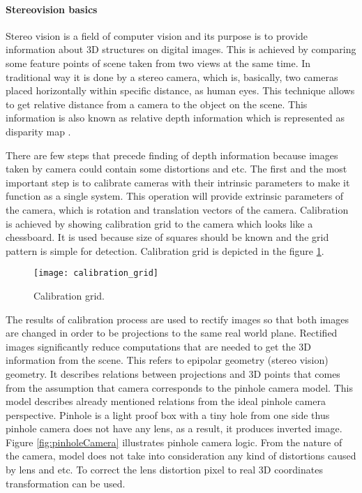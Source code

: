 \documentclass[../../../../main]{subfiles}
\begin{document}
\paragraph{Stereovision basics}

Stereo vision is a field of computer vision and its purpose is to provide information about 3D structures on digital images. This is achieved by comparing some feature points of scene taken from two views at the same time. In traditional way it is done by a stereo camera, which is, basically, two cameras placed horizontally within specific distance, as human eyes. This technique allows to get relative distance from a camera to the object on the scene. This information is also known as relative depth information which is represented as disparity map \cite{Hartley2004}.

There are few steps that precede finding of depth information because images taken by camera could contain some distortions and etc. The first and the most important step is to calibrate cameras with their intrinsic parameters to make it function as a single system. This operation will provide extrinsic parameters of the camera, which is rotation and translation vectors of the camera. Calibration is achieved by showing calibration grid to the camera which looks like a chessboard. It is used because size of squares should be known and the grid pattern is simple for detection. Calibration grid is depicted in the figure \ref{fig:calibrationGrid}.

\begin{figure} [ht]
    \begin{center}
        \texttt{[image: calibration\_grid]}
        \caption{Calibration grid.}
        \label{fig:calibrationGrid}
    \end{center}
\end{figure}

\newpage

The results of calibration process are used to rectify images so that both images are changed in order to be projections to the same real world plane. Rectified images significantly reduce computations that are needed to get the 3D information from the scene. This refers to epipolar geometry (stereo vision) geometry. It describes relations between projections and 3D points that comes from the assumption that camera corresponds to the pinhole camera model. This model describes already mentioned relations from the ideal pinhole camera perspective. Pinhole is a light proof box with a tiny hole from one side thus pinhole camera does not have any lens, as a result, it produces inverted image. Figure \ref{fig:pinholeCamera} illustrates pinhole camera logic. From the nature of the camera, model does not take into consideration any kind of distortions caused by lens and etc. To correct the lens distortion pixel to real 3D coordinates transformation can be used.
\end{document}
